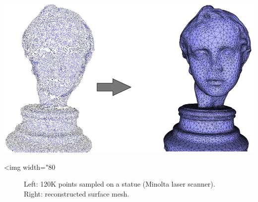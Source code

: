 \begin{center}
    \label{Surface_reconstruction_points_3-fig-eros}
    \begin{ccTexOnly}
      \includegraphics[width=1.0\textwidth]{Surface_reconstruction_points_3/eros} %
    \end{ccTexOnly}
    \begin{ccHtmlOnly}
        <img width="80%
    \end{ccHtmlOnly}
    \begin{figure}[h]
        \caption{Left: 120K points sampled on a statue (Minolta laser scanner).
                 Right: reconstructed surface mesh.}
    \end{figure}
\end{center}

